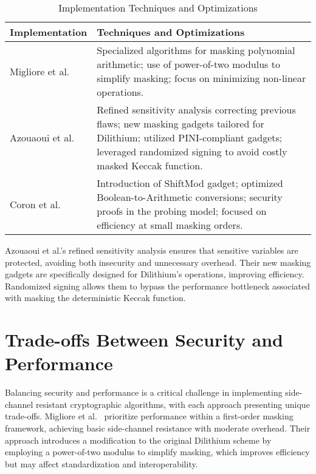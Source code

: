 \begin{table}[h]
    \centering
    \caption{Implementation Techniques and Optimizations}
    \begin{tabular}{l p{11cm}}
        \toprule
        \textbf{Implementation}            & \textbf{Techniques and Optimizations}                                                                                                                                                                     \\
        \midrule
        Migliore et al.\ \cite{Migliore19} & Specialized algorithms for masking polynomial arithmetic; use of power-of-two modulus to simplify masking; focus on minimizing non-linear operations.                                                     \\
        Azouaoui et al.\ \cite{Azouaoui22} & Refined sensitivity analysis correcting previous flaws; new masking gadgets tailored for Dilithium; utilized PINI-compliant gadgets; leveraged randomized signing to avoid costly masked Keccak function. \\
        Coron et al.\ \cite{Coron23}       & Introduction of ShiftMod gadget; optimized Boolean-to-Arithmetic conversions; security proofs in the probing model; focused on efficiency at small masking orders.                                        \\
        \bottomrule
    \end{tabular}
    \label{tab:implementation_techniques}
\end{table}

Azouaoui et al.'s refined sensitivity analysis ensures that sensitive variables are protected, avoiding both insecurity and unnecessary overhead. Their new masking gadgets are specifically designed for Dilithium's operations, improving efficiency. Randomized signing allows them to bypass the performance bottleneck associated with masking the deterministic Keccak function.

\section{Trade-offs Between Security and Performance}

Balancing security and performance is a critical challenge in implementing side-channel resistant cryptographic algorithms, with each approach presenting unique trade-offs. Migliore et al.\ \cite{Migliore19} prioritize performance within a first-order masking framework, achieving basic side-channel resistance with moderate overhead. Their approach introduces a modification to the original Dilithium scheme by employing a power-of-two modulus to simplify masking, which improves efficiency but may affect standardization and interoperability.

